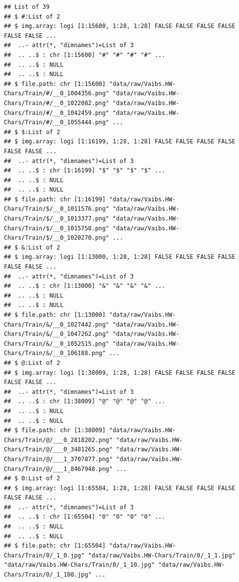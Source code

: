 \documentclass[
]{report}
\begin{document}
\footnotesize

\begin{verbatim}
## List of 39
## $ #:List of 2
## $ img.array: logi [1:15600, 1:28, 1:28] FALSE FALSE FALSE FALSE FALSE FALSE ...
##  ..- attr(*, "dimnames")=List of 3
##  .. ..$ : chr [1:15600] "#" "#" "#" "#" ...
##  .. ..$ : NULL
##  .. ..$ : NULL
## $ file.path: chr [1:15600] "data/raw/Vaibs.HW-Chars/Train/#/__0_1004356.png" "data/raw/Vaibs.HW-Chars/Train/#/__0_1022082.png" "data/raw/Vaibs.HW-Chars/Train/#/__0_1042459.png" "data/raw/Vaibs.HW-Chars/Train/#/__0_1055444.png" ...
## $ $:List of 2
## $ img.array: logi [1:16199, 1:28, 1:28] FALSE FALSE FALSE FALSE FALSE FALSE ...
##  ..- attr(*, "dimnames")=List of 3
##  .. ..$ : chr [1:16199] "$" "$" "$" "$" ...
##  .. ..$ : NULL
##  .. ..$ : NULL
## $ file.path: chr [1:16199] "data/raw/Vaibs.HW-Chars/Train/$/__0_1011576.png" "data/raw/Vaibs.HW-Chars/Train/$/__0_1013377.png" "data/raw/Vaibs.HW-Chars/Train/$/__0_1015758.png" "data/raw/Vaibs.HW-Chars/Train/$/__0_1020270.png" ...
## $ &:List of 2
## $ img.array: logi [1:13000, 1:28, 1:28] FALSE FALSE FALSE FALSE FALSE FALSE ...
##  ..- attr(*, "dimnames")=List of 3
##  .. ..$ : chr [1:13000] "&" "&" "&" "&" ...
##  .. ..$ : NULL
##  .. ..$ : NULL
## $ file.path: chr [1:13000] "data/raw/Vaibs.HW-Chars/Train/&/__0_1027442.png" "data/raw/Vaibs.HW-Chars/Train/&/__0_1047262.png" "data/raw/Vaibs.HW-Chars/Train/&/__0_1052515.png" "data/raw/Vaibs.HW-Chars/Train/&/__0_106188.png" ...
## $ @:List of 2
## $ img.array: logi [1:38009, 1:28, 1:28] FALSE FALSE FALSE FALSE FALSE FALSE ...
##  ..- attr(*, "dimnames")=List of 3
##  .. ..$ : chr [1:38009] "@" "@" "@" "@" ...
##  .. ..$ : NULL
##  .. ..$ : NULL
## $ file.path: chr [1:38009] "data/raw/Vaibs.HW-Chars/Train/@/___0_2818202.png" "data/raw/Vaibs.HW-Chars/Train/@/___0_3481265.png" "data/raw/Vaibs.HW-Chars/Train/@/___1_3707877.png" "data/raw/Vaibs.HW-Chars/Train/@/___1_8467948.png" ...
## $ 0:List of 2
## $ img.array: logi [1:65504, 1:28, 1:28] FALSE FALSE FALSE FALSE FALSE FALSE ...
##  ..- attr(*, "dimnames")=List of 3
##  .. ..$ : chr [1:65504] "0" "0" "0" "0" ...
##  .. ..$ : NULL
##  .. ..$ : NULL
## $ file.path: chr [1:65504] "data/raw/Vaibs.HW-Chars/Train/0/_1_0.jpg" "data/raw/Vaibs.HW-Chars/Train/0/_1_1.jpg" "data/raw/Vaibs.HW-Chars/Train/0/_1_10.jpg" "data/raw/Vaibs.HW-Chars/Train/0/_1_100.jpg" ...
\end{verbatim}

\normalsize

\newpage

\footnotesize
\end{document}

